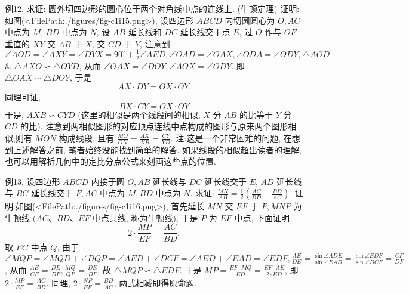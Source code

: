 例12. 求证: 圆外切四边形的圆心位于两个对角线中点的连线上.
(牛顿定理)
证明:如图(<FilePath:./figures/fig-c1i15.png>), 设四边形 $A B C D$ 内切圆圆心为 $O, A C$ 中点为 $M$,
$B D$ 中点为 $N$, 设 $A B$ 延长线和 $D C$ 延长线交于点 $E$, 过 $O$ 作与 $O E$ 垂直的 $X Y$ 交 $A B$ 于 $X$, 交 $C D$ 于 $Y$, 注意到 $\angle A O D=\angle A X Y=\angle D Y X=90^{\circ}+\frac{1}{2} \angle A E D, \angle O A D= \angle O A X, \angle O D A=\angle O D Y, \triangle A O D$ \& $\triangle A X O \backsim \triangle O Y D$, 从而 $\angle O A X=\angle D O Y, \angle A O X=\angle O D Y$.
即 $\triangle O A X \backsim \triangle D O Y$, 于是
$$
A X \cdot D Y=O X \cdot O Y,
$$
同理可证,
$$
B X \cdot C Y=O X \cdot O Y .
$$
于是, $A X B \backsim C Y D$ (这里的相似是两个线段间的相似, $X$ 分 $A B$ 的比等于 $Y$ 分 $C D$ 的比), 注意到两相似图形的对应顶点连线中点构成的图形与原来两个图形相似,则有 $M O N$ 构成线段, 且有 $\frac{M O}{O N}=\frac{A X}{X B}=\frac{C Y}{Y D}$.
注:这是一个非常困难的问题, 在想到上述解答之前, 笔者始终没能找到简单的解答.
如果线段的相似超出读者的理解, 也可以用解析几何中的定比分点公式来刻画这些点的位置.



例13. 设四边形 $A B C D$ 内接于圆 $O, A B$ 延长线与 $D C$ 延长线交于 $E$,
$A D$ 延长线与 $B C$ 延长线交于 $F, A C$ 中点为 $M, B D$ 中点为 $N$.
求证: $\frac{M N}{A B}=\frac{1}{2}\left(\frac{A C}{B D}-\frac{B D}{A C}\right)$.
证明:如图(<FilePath:./figures/fig-c1i16.png>), 首先延长 $M N$ 交 $E F$ 于 $P, M N P$ 为牛顿线 $(A C 、 B D 、 E F$ 中点共线, 称为牛顿线), 于是 $P$ 为 $E F$ 中点, 下面证明
$$
2 \cdot \frac{M P}{E F}=\frac{A C}{B D} \text {. }
$$
取 $E C$ 中点 $Q$, 由于 $\angle M Q P=\angle M Q D+\angle D Q P=\angle A E D+\angle D C F=\angle A E D+\angle E A D= \angle E D F, \frac{A E}{D E}=\frac{\sin \angle A D E}{\sin \angle E A D}=\frac{\sin \angle E D F}{\sin \angle D C F}=\frac{C F}{D F}$, 从而 $\frac{A E}{C F}=\frac{D E}{D F}, \frac{M Q}{Q P}=\frac{D E}{D F}$, 故 $\triangle M Q P \backsim \triangle E D F$.
于是 $M P=\frac{E F \cdot M Q}{E D}=\frac{E F \cdot A E}{2 \cdot E D}$, 即 $2 \cdot \frac{M P}{E F}=\frac{A C}{B D}$.
同理, $2 \cdot \frac{N P}{E F}=\frac{B D}{A C}$, 两式相减即得原命题.


